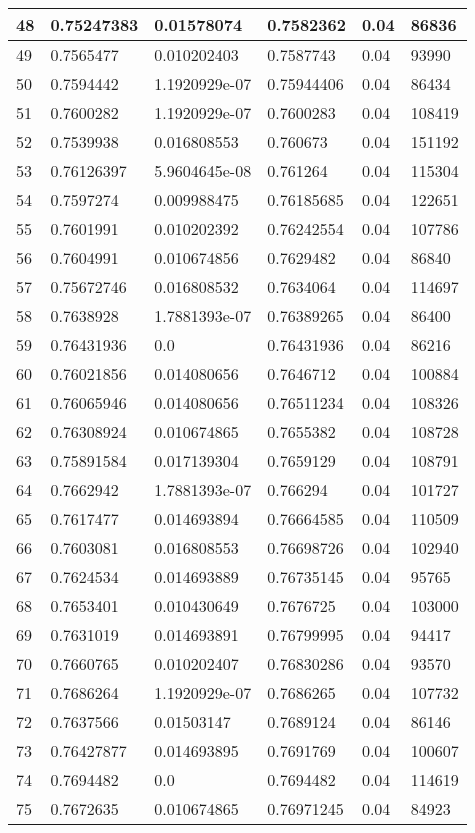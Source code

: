\begin{longtable}{|l|l|l|l|l|l|}
48 & 0.75247383 & 0.01578074 & 0.7582362 & 0.04 & 86836 \\ \hline 
49 & 0.7565477 & 0.010202403 & 0.7587743 & 0.04 & 93990 \\ \hline 
50 & 0.7594442 & 1.1920929e-07 & 0.75944406 & 0.04 & 86434 \\ \hline 
51 & 0.7600282 & 1.1920929e-07 & 0.7600283 & 0.04 & 108419 \\ \hline 
52 & 0.7539938 & 0.016808553 & 0.760673 & 0.04 & 151192 \\ \hline 
53 & 0.76126397 & 5.9604645e-08 & 0.761264 & 0.04 & 115304 \\ \hline 
54 & 0.7597274 & 0.009988475 & 0.76185685 & 0.04 & 122651 \\ \hline 
55 & 0.7601991 & 0.010202392 & 0.76242554 & 0.04 & 107786 \\ \hline 
56 & 0.7604991 & 0.010674856 & 0.7629482 & 0.04 & 86840 \\ \hline 
57 & 0.75672746 & 0.016808532 & 0.7634064 & 0.04 & 114697 \\ \hline 
58 & 0.7638928 & 1.7881393e-07 & 0.76389265 & 0.04 & 86400 \\ \hline 
59 & 0.76431936 & 0.0 & 0.76431936 & 0.04 & 86216 \\ \hline 
60 & 0.76021856 & 0.014080656 & 0.7646712 & 0.04 & 100884 \\ \hline 
61 & 0.76065946 & 0.014080656 & 0.76511234 & 0.04 & 108326 \\ \hline 
62 & 0.76308924 & 0.010674865 & 0.7655382 & 0.04 & 108728 \\ \hline 
63 & 0.75891584 & 0.017139304 & 0.7659129 & 0.04 & 108791 \\ \hline 
64 & 0.7662942 & 1.7881393e-07 & 0.766294 & 0.04 & 101727 \\ \hline 
65 & 0.7617477 & 0.014693894 & 0.76664585 & 0.04 & 110509 \\ \hline 
66 & 0.7603081 & 0.016808553 & 0.76698726 & 0.04 & 102940 \\ \hline 
67 & 0.7624534 & 0.014693889 & 0.76735145 & 0.04 & 95765 \\ \hline 
68 & 0.7653401 & 0.010430649 & 0.7676725 & 0.04 & 103000 \\ \hline 
69 & 0.7631019 & 0.014693891 & 0.76799995 & 0.04 & 94417 \\ \hline 
70 & 0.7660765 & 0.010202407 & 0.76830286 & 0.04 & 93570 \\ \hline 
71 & 0.7686264 & 1.1920929e-07 & 0.7686265 & 0.04 & 107732 \\ \hline 
72 & 0.7637566 & 0.01503147 & 0.7689124 & 0.04 & 86146 \\ \hline 
73 & 0.76427877 & 0.014693895 & 0.7691769 & 0.04 & 100607 \\ \hline 
74 & 0.7694482 & 0.0 & 0.7694482 & 0.04 & 114619 \\ \hline 
75 & 0.7672635 & 0.010674865 & 0.76971245 & 0.04 & 84923 \\ \hline 
\end{longtable}